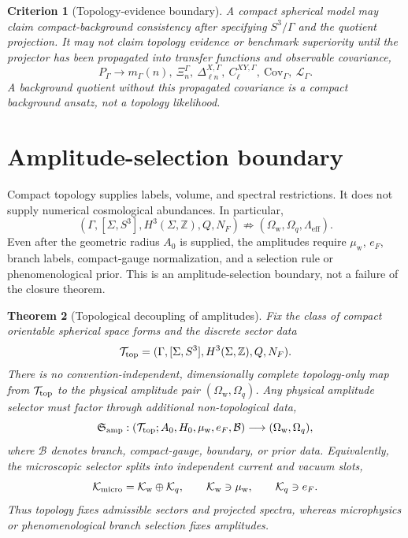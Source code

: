 \documentclass[
  aps,
  prd,
  reprint,
  superscriptaddress,
  floatfix,
  nofootinbib,
  longbibliography
]{revtex4-2}
\theoremstyle{plain}
\newtheorem{theorem}{Theorem}
\newtheorem{criterion}[theorem]{Criterion}
\theoremstyle{definition}
\theoremstyle{remark}
\newcommand{\wind}{\mathrm w}
\newcommand{\eff}{\mathrm{eff}}
\newcommand{\Ow}{\Omega_{\mathrm w}}
\newcommand{\Oq}{\Omega_q}
\newcommand{\Z}{\mathbb Z}
\newcommand{\NF}{N_F}
\newcommand{\eF}{e_F}
\newcommand{\PG}{P_\Gamma}
\begin{document}
\begin{criterion}[Topology-evidence boundary]
A compact spherical model may claim compact-background consistency after
specifying \(S^3/\Gamma\) and the quotient projection.  It may not claim topology
evidence or benchmark superiority until the projector has been propagated into
transfer functions and observable covariance,
\begin{equation}
\PG\longrightarrow
m_\Gamma(n),\ \Xi_n^\Gamma,\
\Delta_{\ell n}^{X,\Gamma},\ C_\ell^{XY,\Gamma},\
\mathrm{Cov}_\Gamma,\ \mathcal L_\Gamma .
\label{eq:transfer_boundary_v5}
\end{equation}
A background quotient without this propagated covariance is a compact background
ansatz, not a topology likelihood.
\end{criterion}

\section{Amplitude-selection boundary}

Compact topology supplies labels, volume, and spectral restrictions.  It does
not supply numerical cosmological abundances.  In particular,
\begin{equation}
(\Gamma,[\Sigma,S^3],H^3(\Sigma,\Z),Q,\NF)
\not\Rightarrow
(\Ow,\Oq,\Lambda_{\eff}) .
\label{eq:not_amplitudes_v5}
\end{equation}
Even after the geometric radius \(A_0\) is supplied, the amplitudes require
\(\mu_{\wind}\), \(\eF\), branch labels, compact-gauge normalization, and a
selection rule or phenomenological prior.  This is an amplitude-selection
boundary, not a failure of the closure theorem.


\begin{theorem}[Topological decoupling of amplitudes]
\label{thm:topological_decoupling_v12}
Fix the class of compact orientable spherical space forms and the discrete
sector data
\[
\mathcal T_{\rm top}=(\Gamma,[\Sigma,S^3],H^3(\Sigma,\Z),Q,\NF) .
\]
There is no convention-independent, dimensionally complete topology-only map
from \(\mathcal T_{\rm top}\) to the physical amplitude pair
\((\Ow,\Oq)\).  Any physical amplitude selector must factor through additional
non-topological data,
\begin{equation}
\mathfrak S_{\rm amp}:
(\mathcal T_{\rm top};A_0,H_0,\mu_{\wind},\eF,\mathcal B)
\longrightarrow
(\Ow,\Oq),
\label{eq:split_amp_selector_v12}
\end{equation}
where \(\mathcal B\) denotes branch, compact-gauge, boundary, or prior data.
Equivalently, the microscopic selector splits into independent current and
vacuum slots,
\begin{equation}
\mathcal K_{\rm micro}=\mathcal K_{\wind}\oplus\mathcal K_q,
\qquad
\mathcal K_{\wind}\ni \mu_{\wind},
\qquad
\mathcal K_q\ni \eF .
\label{eq:micro_selector_split_v12}
\end{equation}
Thus topology fixes admissible sectors and projected spectra, whereas
microphysics or phenomenological branch selection fixes amplitudes.
\end{theorem}
\end{document}
